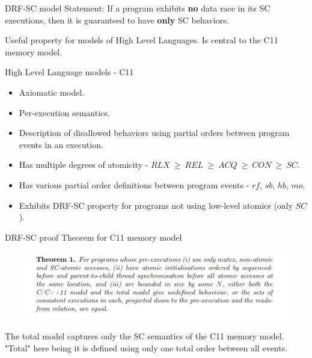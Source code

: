 \documentclass{beamer}
\begin{document}
    \begin{frame}{DRF-SC model}
        Statement:
        \center If a program exhibits \textbf{no} data race in its SC executions, then it is guaranteed to have \textbf{only} SC behaviors.

        Useful property for models of High Level Languages. 
        Is central to the C11 memory model. 
    \end{frame}

    \begin{frame}{High Level Language models - C11}
        
        \begin{itemize}
            \item Axiomatic model.
            \item Per-execution semantics.
            \item Description of disallowed behaviors using partial orders between program events in an execution.
            \item Has multiple degrees of atomicity - $RLX \ \geq \ REL \ \geq \ ACQ \ \geq \ CON \ \geq \ SC$.
            \item Has various partial order definitions between program events - $rf$, $sb$, $hb$, $mo$. 
            \item Exhibits DRF-SC property for programs not using low-level atomics (only $SC$).
        \end{itemize}
        
    \end{frame}

    \begin{frame}{DRF-SC proof Theorem for C11 memory model}

        \begin{figure}
            \centering
            \includegraphics[scale=0.5]{DRF-SC.PNG}
        \end{figure}

        The total model captures only the SC semantics of the C11 memory model. 
        "Total" here being it is defined using only one total order between all events.
        
    \end{frame}
\end{document}
